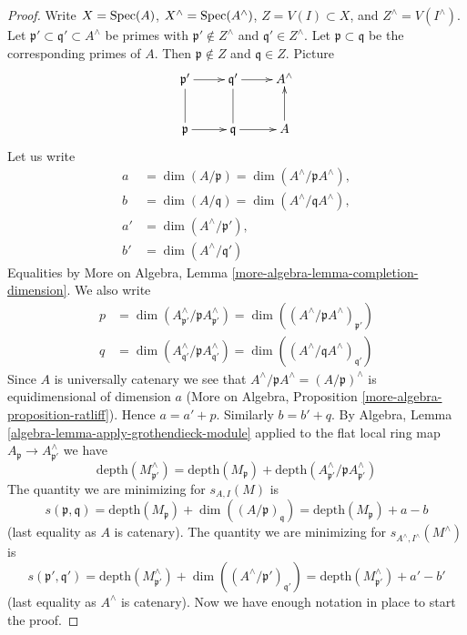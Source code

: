 \begin{proof}
Write $X = \mathop{\mathrm{Spec}}(A)$, $X^\wedge = \mathop{\mathrm{Spec}}(A^\wedge)$, $Z = V(I) \subset X$, and
$Z^\wedge = V(I^\wedge)$.
Let $\mathfrak p' \subset \mathfrak q' \subset A^\wedge$
be primes with $\mathfrak p' \not \in Z^\wedge$ and
$\mathfrak q' \in Z^\wedge$. Let $\mathfrak p \subset \mathfrak q$
be the corresponding primes of $A$. Then $\mathfrak p \not \in Z$
and $\mathfrak q \in Z$. Picture
$$
\xymatrix{
\mathfrak p' \ar[r] & \mathfrak q' \ar[r] & A^\wedge \\
\mathfrak p \ar[r] \ar@{-}[u] &
\mathfrak q \ar[r] \ar@{-}[u] & A \ar[u]
}
$$
Let us write
\begin{align*}
a & = \dim(A/\mathfrak p) = \dim(A^\wedge/\mathfrak pA^\wedge),\\
b & = \dim(A/\mathfrak q) = \dim(A^\wedge/\mathfrak qA^\wedge),\\
a' & = \dim(A^\wedge/\mathfrak p'),\\
b' & = \dim(A^\wedge/\mathfrak q')
\end{align*}
Equalities by
More on Algebra, Lemma \ref{more-algebra-lemma-completion-dimension}.
We also write
\begin{align*}
p & = \dim(A^\wedge_{\mathfrak p'}/\mathfrak p A^\wedge_{\mathfrak p'}) =
\dim((A^\wedge/\mathfrak p A^\wedge)_{\mathfrak p'}) \\
q & = \dim(A^\wedge_{\mathfrak q'}/\mathfrak p A^\wedge_{\mathfrak q'}) =
\dim((A^\wedge/\mathfrak q A^\wedge)_{\mathfrak q'})
\end{align*}
Since $A$ is universally catenary we see that
$A^\wedge/\mathfrak pA^\wedge = (A/\mathfrak p)^\wedge$
is equidimensional of dimension $a$
(More on Algebra, Proposition \ref{more-algebra-proposition-ratliff}).
Hence $a = a' + p$. Similarly $b = b' + q$.
By Algebra, Lemma \ref{algebra-lemma-apply-grothendieck-module}
applied to the flat local ring map
$A_\mathfrak p \to A^\wedge_{\mathfrak p'}$
we have
$$
\text{depth}(M^\wedge_{\mathfrak p'})
=
\text{depth}(M_\mathfrak p) +
\text{depth}(A^\wedge_{\mathfrak p'} / \mathfrak p A^\wedge_{\mathfrak p'})
$$
The quantity we are minimizing for $s_{A, I}(M)$ is
$$
s(\mathfrak p, \mathfrak q) =
\text{depth}(M_\mathfrak p) + \dim((A/\mathfrak p)_\mathfrak q) =
\text{depth}(M_\mathfrak p) + a - b
$$
(last equality as $A$ is catenary). The quantity we are minimizing
for $s_{A^\wedge, I^\wedge}(M^\wedge)$
is
$$
s(\mathfrak p', \mathfrak q') =
\text{depth}(M^\wedge_{\mathfrak p'}) +
\dim((A^\wedge/\mathfrak p')_{\mathfrak q'}) =
\text{depth}(M^\wedge_{\mathfrak p'}) + a' - b'
$$
(last equality as $A^\wedge$ is catenary).
Now we have enough notation in place to start the proof.


\end{proof}
